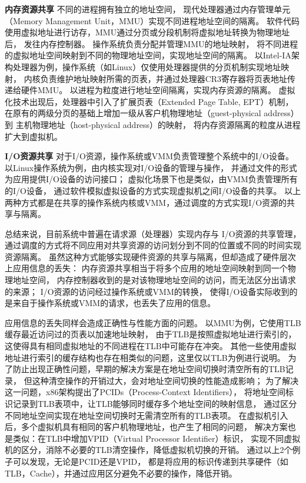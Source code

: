 \textbf{内存资源共享}\quad	%
不同的进程拥有独立的地址空间，
现代处理器通过内存管理单元（Memory Management Unit，MMU）实现不同进程地址空间的隔离。
软件代码使用虚拟地址进行访存，MMU通过分页或分段机制将虚拟地址转换为物理地址后，
发往内存控制器。
操作系统负责分配并管理MMU的地址映射，
将不同进程的虚拟地址空间映射到不同的物理地址空间，实现地址空间的隔离。
以Intel-IA架构处理器为例，操作系统（如Linux）仅使用处理器提供的分页机制实现地址映射，
内核负责维护地址映射所需的页表，并通过处理器CR3寄存器将页表地址传递给硬件MMU。
以进程为粒度进行地址空间隔离，实现内存资源的隔离。
虚拟化技术出现后，处理器中引入了扩展页表（Extended Page Table, EPT）机制，
在原有的两级分页的基础上增加一级从客户机物理地址（guest-physical address）到
主机物理地址（host-physical address）的映射，
将内存资源隔离的粒度从进程扩大到虚拟机。

\textbf{I/O资源共享}\quad	%
对于I/O资源，操作系统或VMM负责管理整个系统中的I/O设备。
以Linux操作系统为例，由内核实现对I/O设备的管理与操作，
并通过文件的形式为应用提供I/O设备的访问接口；
虚拟化场景下也是类似，由VMM负责管理所有的I/O设备，
通过软件模拟虚拟设备的方式实现虚拟机之间I/O设备的共享。
以上两种方式都是在共享的操作系统内核或VMM，通过调度的方式实现I/O资源的共享与隔离。

总结来说，目前系统中普遍在请求源（处理器）实现内存与 I/O资源的共享管理，
通过调度的方式将不同应用对共享资源的访问划分到不同的位置或不同的时间实现资源隔离。
虽然这种方式能够实现硬件资源的共享与隔离，但却造成了硬件层次上应用信息的丢失：
内存资源共享相当于将多个应用的地址空间映射到同一个物理地址空间，
内存控制器收到的是对该物理地址空间的访问，而无法区分出请求的来源；
I/O资源的访问经过操作系统或VMM的转换，
使得I/O设备实际收到的是来自于操作系统或VMM的请求，也丢失了应用的信息。

应用信息的丢失同样会造成正确性与性能方面的问题。
以MMU为例，它使用TLB缓存最近访问过的页表以加速地址映射，
由于TLB是按照虚拟地址进行索引的，这使得具有相同虚拟地址的不同进程在TLB中可能存在冲突。
其他一些使用虚拟地址进行索引的缓存结构也存在相类似的问题，这里仅以TLB为例进行说明。
为了防止出现正确性问题，早期的解决方案是在地址空间切换时清空所有的TLB记录，
但这种清空操作的开销过大，会对地址空间切换的性能造成影响；
为了解决这一问题，x86架构提出了PCIDs（Process-Context Identifiers），
将地址空间标识记录到TLB表项中，让TLB能够同时缓存多个地址空间的映射信息，
通过区分不同地址空间实现在地址空间切换时无需清空所有的TLB表项。
在虚拟机引入后，多个虚拟机具有相同的客户机物理地址，也产生了相同的问题，
解决方案也是类似：在TLB中增加VPID（Virtual Processor Identifier）标识，
实现不同虚拟机的区分，消除不必要的TLB清空操作，降低虚拟机切换的开销。
通过以上2个例子可以发现，无论是PCID还是VPID，
都是将应用的标识传递到共享硬件（如TLB，Cache），并通过应用区分避免不必要的操作，降低开销。

